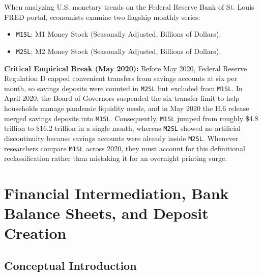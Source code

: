 \documentclass[11pt, oneside]{book}
\begin{document}
\begin{fredbox}
When analyzing U.S. monetary trends on the Federal Reserve Bank of St. Louis FRED portal, economists examine two flagship monthly series:
\begin{itemize}[leftmargin=1.5em, itemsep=2pt]
  \item \texttt{M1SL}: M1 Money Stock (Seasonally Adjusted, Billions of Dollars).
  \item \texttt{M2SL}: M2 Money Stock (Seasonally Adjusted, Billions of Dollars).
\end{itemize}
\textbf{Critical Empirical Break (May 2020):} Before May 2020, Federal Reserve Regulation D capped convenient transfers from savings accounts at six per month, so savings deposits were counted in \texttt{M2SL} but excluded from \texttt{M1SL}. In April 2020, the Board of Governors suspended the six-transfer limit to help households manage pandemic liquidity needs, and in May 2020 the H.6 release merged savings deposits into \texttt{M1SL}. Consequently, \texttt{M1SL} jumped from roughly \$4.8 trillion to \$16.2 trillion in a single month, whereas \texttt{M2SL} showed no artificial discontinuity because savings accounts were already inside \texttt{M2SL}. Whenever researchers compare \texttt{M1SL} across 2020, they must account for this definitional reclassification rather than mistaking it for an overnight printing surge.
\end{fredbox}

\section{Financial Intermediation, Bank Balance Sheets, and Deposit Creation}

\subsection*{Conceptual Introduction}
\end{document}
